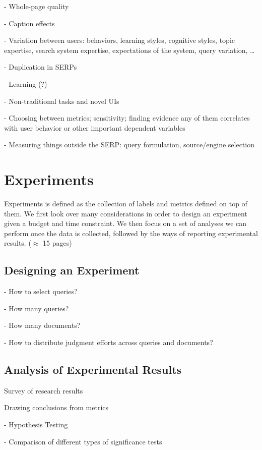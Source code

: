 \documentclass[openany]{now} %
\begin{document}
- Whole-page quality

- Caption effects

- Variation between users: behaviors, learning styles, cognitive styles, topic expertise, search system expertise, expectations of the system, query variation, \dots

- Duplication in SERPs

- Learning (?)

- Non-traditional tasks and novel UIs

- Choosing between metrics; sensitivity; finding evidence any of them correlates with user behavior or other important dependent variables

- Measuring things outside the SERP: query formulation, source/engine selection

\chapter{Experiments}
\label{c-experiment}

Experiments is defined as the collection of labels and metrics defined on top of them. We first look over many considerations in order to design an experiment given a budget and time constraint. We then focus on a set of analyses we can perform once the data is collected, followed by the ways of reporting experimental results. (\ensuremath{\approx} 15 pages)

\section{Designing an Experiment}

- How to select queries?

- How many queries? \cite{Sakai:2014}

- How many documents? \cite{CarterettePFK09}

- How to distribute judgment efforts across queries and documents? \cite{CarterettePKAA09, YilmazR09}


\section{Analysis of Experimental Results}

Survey of research results \cite{Sakai:2016}

Drawing conclusions from metrics 

- Hypothesis Testing \cite{Dincer:2014}

- Comparison of different types of significance tests \cite{SmuckerAC09}
\end{document}
